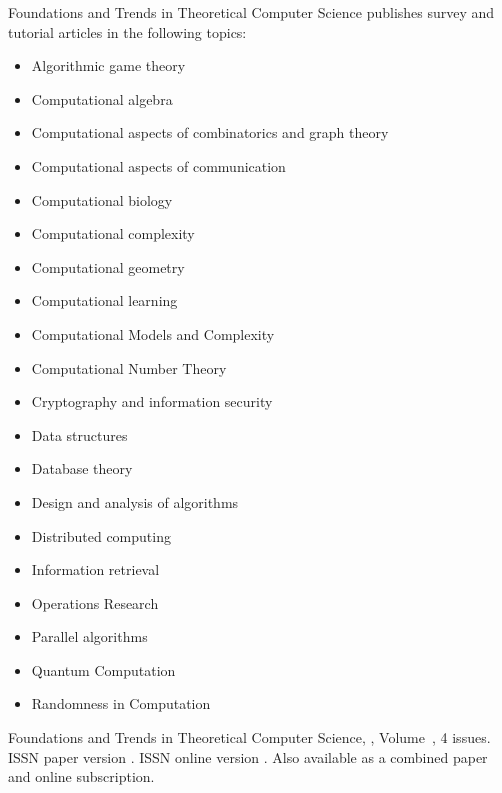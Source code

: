 


\journalaimsandscope
 {%
  Foundations and Trends\textsuperscript{\textregistered} in Theoretical Computer Science publishes
 survey and tutorial articles in the following topics:
 \begin{multicols}{2}\raggedcolumns
 \begin{itemize}
\item{Algorithmic game theory}
    \item{Computational algebra}
    \item{Computational aspects of combinatorics and graph theory}
    \item{Computational aspects of communication}
    \item{Computational biology}
    \item{Computational complexity}
    \item{Computational geometry}
    \item{Computational learning}
    \item{Computational Models and Complexity}
    \item{Computational Number Theory}
    \item{Cryptography and information security}
    \item{Data structures}
    \item{Database theory}
    \item{Design and analysis of algorithms}
    \item{Distributed computing}
    \item{Information retrieval}
    \item{Operations Research}
    \item{Parallel algorithms}
    \item{Quantum Computation}
    \item{Randomness in Computation}
\end{itemize}
\end{multicols}
 }


\journallibraryinfo
 {%
  Foundations and Trends\textsuperscript{\textregistered} in Theoretical Computer Science, ,
  Volume~, 4 issues.
  ISSN paper version .
  ISSN online version .
  Also available as a combined paper and online
  subscription.
 } 